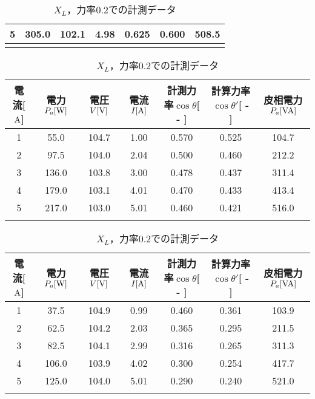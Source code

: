 \begin{table}[h]
\begin{tabular}{ccccccc}
	5 & 305.0 & 102.1 & 4.98 & 0.625 & 0.600 & 508.5 \\ \hline\\
\end{tabular}
	\caption{$X_{L}$，力率$0.4$での計測データ}
	\label{tab:0.4data}
\begin{tabular}{ccccccc}
	\hline
	電流[$\rm{A}$] & 電力$P_a[\rm{W}]$ & 電圧$V[\rm{V}]$ & 電流$I[\rm{A}]$ & 計測力率$\cos \theta$[ - ] & 計算力率$\cos \theta '$[ - ] & 皮相電力$P_a[\rm{VA}]$ \\ \hline
	1 & 55.0  & 104.7 & 1.00 & 0.570 & 0.525 & 104.7 \\
	2 & 97.5  & 104.0 & 2.04 & 0.500 & 0.460 & 212.2 \\
	3 & 136.0 & 103.8 & 3.00 & 0.478 & 0.437 & 311.4 \\
	4 & 179.0 & 103.1 & 4.01 & 0.470 & 0.433 & 413.4 \\
	5 & 217.0 & 103.0 & 5.01 & 0.460 & 0.421 & 516.0 \\ \hline\\
\end{tabular}
	\caption{$X_{L}$，力率$0.2$での計測データ}
	\label{tab:0.2data}
\begin{tabular}{ccccccc}
	\hline
	電流[$\rm{A}$] & 電力$P_a[\rm{W}]$ & 電圧$V[\rm{V}]$ & 電流$I[\rm{A}]$ & 計測力率$\cos \theta$[ - ] & 計算力率$\cos \theta '$[ - ] & 皮相電力$P_a[\rm{VA}]$ \\ \hline
	1 & 37.5  & 104.9 & 0.99 & 0.460 & 0.361 & 103.9 \\
	2 & 62.5  & 104.2 & 2.03 & 0.365 & 0.295 & 211.5 \\
	3 & 82.5  & 104.1 & 2.99 & 0.316 & 0.265 & 311.3 \\
	4 & 106.0 & 103.9 & 4.02 & 0.300 & 0.254 & 417.7 \\
	5 & 125.0 & 104.0 & 5.01 & 0.290 & 0.240 & 521.0 \\ \hline\\
\end{tabular}
\end{table}
